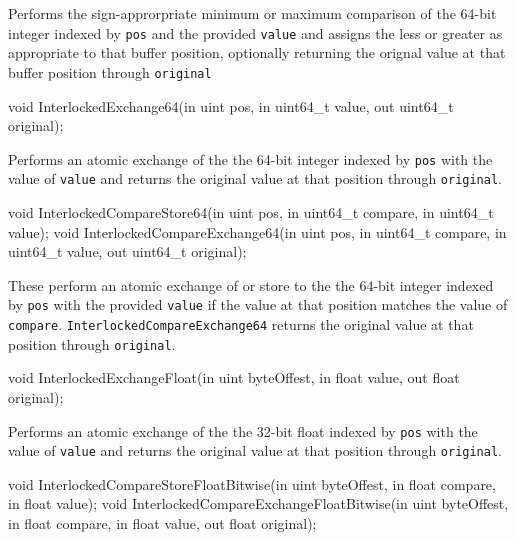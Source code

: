 Performs the sign-approrpriate minimum or maximum comparison of the 64-bit integer indexed by \texttt{pos}
and the provided \texttt{value} and assigns the less or greater as appropriate to that buffer position,
optionally returning the orignal value at that buffer position through \texttt{original}

\begin{HLSL}
   void InterlockedExchange64(in uint pos, in uint64_t value, out uint64_t original);
\end{HLSL}

Performs an atomic exchange of the the 64-bit integer indexed by \texttt{pos} with
the value of \texttt{value} and returns the original value at that position through \texttt{original}.

\begin{HLSL}
   void InterlockedCompareStore64(in uint pos, in uint64_t compare,
                                   in uint64_t value);
   void InterlockedCompareExchange64(in uint pos, in uint64_t compare,
                                      in uint64_t value, out uint64_t original);
\end{HLSL}

These perform an atomic exchange of or store to the the 64-bit integer indexed by \texttt{pos}
with the provided \texttt{value} if the value at that position matches the value of \texttt{compare}.
\texttt{InterlockedCompareExchange64} returns the original value at that position through \texttt{original}.

\begin{HLSL}
   void InterlockedExchangeFloat(in uint byteOffest, in float value,
                                  out float original);
\end{HLSL}

Performs an atomic exchange of the the 32-bit float indexed by \texttt{pos} with
the value of \texttt{value} and returns the original value at that position through \texttt{original}.

\begin{HLSL}
  void InterlockedCompareStoreFloatBitwise(in uint byteOffest, in float compare,
                                            in float value);
  void InterlockedCompareExchangeFloatBitwise(in uint byteOffest,
                                               in float compare,
                                               in float value,
                                               out float original);
\end{HLSL}

